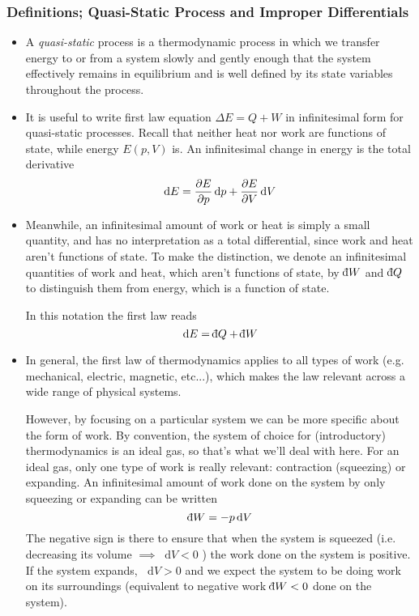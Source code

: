 \documentclass[11pt, a4paper]{article}
\newcommand{\diff}{\mathop{}\!\mathrm{d}} %
\newcommand{\dbar}{{\mathchar '26\mkern -11mu \mathrm{d}}} %
\begin{document}
\subsubsection{Definitions; Quasi-Static Process and Improper Differentials}
\begin{itemize}
	\item A \textit{quasi-static} process is a thermodynamic process in which we transfer energy to or from a system slowly and gently enough that the system effectively remains in equilibrium and is well defined by its state variables throughout the process.
	
	\item It is useful to write first law equation $ \Delta E = Q + W $ in infinitesimal form for quasi-static processes. Recall that neither heat nor work are functions of state, while energy $ E(p, V) $ is. An infinitesimal change in energy is the total derivative
	\begin{equation*}
		\diff E = \pdv{E}{p}\diff p + \pdv{E}{V}\diff V
	\end{equation*}
	
	\item Meanwhile, an infinitesimal amount of work or heat is simply a small quantity, and has no interpretation as a total differential, since work and heat aren't functions of state. To make the distinction, we denote an infinitesimal quantities of work and heat, which aren't functions of state, by $ \dbar W $ and $ \dbar Q$ to distinguish them from energy, which is a function of state. 
	
	In this notation the first law reads
	\begin{equation*}
		\diff E = \dbar Q + \dbar W
	\end{equation*}
	
	\item In general, the first law of thermodynamics applies to all types of work (e.g. mechanical, electric, magnetic, etc...), which makes the law relevant across a wide range of physical systems.
	
	However, by focusing on a particular system we can be more specific about the form of work. By convention, the system of choice for (introductory) thermodynamics is an ideal gas, so that's what we'll deal with here. For an ideal gas, only one type of work is really relevant: contraction (squeezing) or expanding. An infinitesimal amount of work done on the system by only squeezing or expanding can be written
	\begin{equation*}
		\dbar W = - p \diff V
	\end{equation*}
	The negative sign is there to ensure that when the system is squeezed (i.e. decreasing its volume $ \implies \diff V < 0 $ ) the work done on the system is positive. If the system expands, $ \diff V > 0 $ and we expect the system to be doing work on its surroundings (equivalent to negative work $ \dbar W < 0 $ done on the system).
	

\end{itemize}
\end{document}
